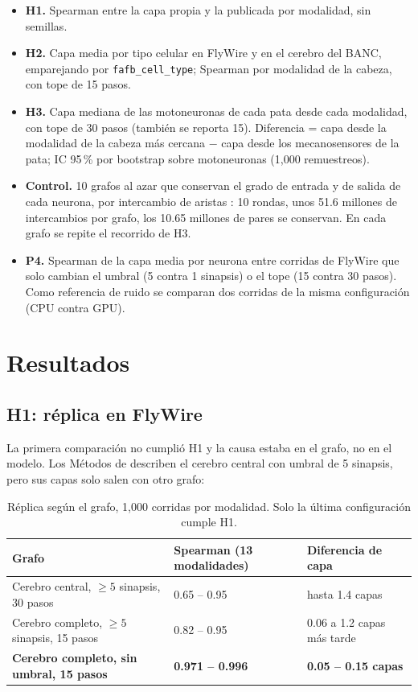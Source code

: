 \documentclass[11pt,letterpaper]{article}
\begin{document}
\begin{itemize}
  \item \textbf{H1.} Spearman entre la capa propia y la publicada por modalidad, sin semillas.
  \item \textbf{H2.} Capa media por tipo celular en FlyWire y en el cerebro del BANC, emparejando por \texttt{fafb\_cell\_type}; Spearman por modalidad de la cabeza, con tope de 15 pasos.
  \item \textbf{H3.} Capa mediana de las motoneuronas de cada pata desde cada modalidad, con tope de 30 pasos (también se reporta 15). Diferencia = capa desde la modalidad de la cabeza más cercana $-$ capa desde los mecanosensores de la pata; IC 95\,\% por bootstrap sobre motoneuronas (1{,}000 remuestreos).
  \item \textbf{Control.} 10 grafos al azar que conservan el grado de entrada y de salida de cada neurona, por intercambio de aristas \citep{maslov2002}: 10 rondas, unos 51.6 millones de intercambios por grafo, los 10.65 millones de pares se conservan. En cada grafo se repite el recorrido de H3.
  \item \textbf{P4.} Spearman de la capa media por neurona entre corridas de FlyWire que solo cambian el umbral (5 contra 1 sinapsis) o el tope (15 contra 30 pasos). Como referencia de ruido se comparan dos corridas de la misma configuración (CPU contra GPU).
\end{itemize}

\section{Resultados}

\subsection{H1: réplica en FlyWire}

La primera comparación no cumplió H1 y la causa estaba en el grafo, no en el modelo. Los Métodos de \citet{dorkenwald2024} describen el cerebro central con umbral de 5 sinapsis, pero sus capas solo salen con otro grafo:

\begin{table}[H]
\centering
\small
\begin{tabularx}{\linewidth}{@{}LXX@{}}
\toprule
\textbf{Grafo} & \textbf{Spearman (13 modalidades)} & \textbf{Diferencia de capa} \\
\midrule
Cerebro central, $\ge 5$ sinapsis, 30 pasos & 0.65 -- 0.95 & hasta 1.4 capas \\
Cerebro completo, $\ge 5$ sinapsis, 15 pasos & 0.82 -- 0.95 & 0.06 a 1.2 capas más tarde \\
\textbf{Cerebro completo, sin umbral, 15 pasos} & \textbf{0.971 -- 0.996} & \textbf{0.05 -- 0.15 capas} \\
\bottomrule
\end{tabularx}
\caption{Réplica según el grafo, 1{,}000 corridas por modalidad. Solo la última configuración cumple H1.}
\end{table}
\end{document}
